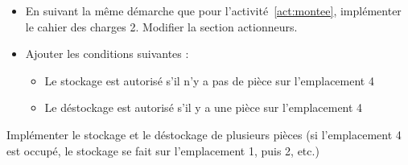 \documentclass[11pt, multicol]{article}
\begin{document}
\begin{UPSTIactivite}
\begin{itemize}
	\item En suivant la même démarche que pour l'activité~\ref{act:montee}, implémenter le cahier des charges 2.
	Modifier la section actionneurs.
	\item Ajouter les conditions suivantes :
	\begin{itemize}
		\item Le stockage est autorisé s’il n’y a pas de pièce sur l’emplacement 4
		\item Le déstockage est autorisé s’il y a une pièce sur l’emplacement 4
	\end{itemize}
\end{itemize}
\end{UPSTIactivite}

\begin{UPSTIactivite}
	Implémenter le stockage et le déstockage de plusieurs pièces (si l'emplacement 4 est occupé, le stockage se fait sur l'emplacement 1, puis 2, etc.)
\end{UPSTIactivite}
\end{document}

